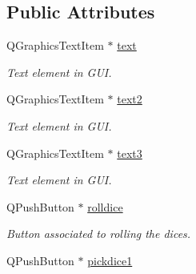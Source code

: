 \subsection*{Public Attributes}
\begin{DoxyCompactItemize}
\item 
\hypertarget{classgameScene__1_ad5566342744b3278fa281479993b5a7b}{Q\-Graphics\-Text\-Item $\ast$ \hyperlink{classgameScene__1_ad5566342744b3278fa281479993b5a7b}{text}}\label{classgameScene__1_ad5566342744b3278fa281479993b5a7b}

\begin{DoxyCompactList}\small\item\em Text element in G\-U\-I. \end{DoxyCompactList}\item 
\hypertarget{classgameScene__1_af4a2b60c066b3e965a672dec9f4ff892}{Q\-Graphics\-Text\-Item $\ast$ \hyperlink{classgameScene__1_af4a2b60c066b3e965a672dec9f4ff892}{text2}}\label{classgameScene__1_af4a2b60c066b3e965a672dec9f4ff892}

\begin{DoxyCompactList}\small\item\em Text element in G\-U\-I. \end{DoxyCompactList}\item 
\hypertarget{classgameScene__1_ae17987bf12c7ae15fd5152f2d4bce67c}{Q\-Graphics\-Text\-Item $\ast$ \hyperlink{classgameScene__1_ae17987bf12c7ae15fd5152f2d4bce67c}{text3}}\label{classgameScene__1_ae17987bf12c7ae15fd5152f2d4bce67c}

\begin{DoxyCompactList}\small\item\em Text element in G\-U\-I. \end{DoxyCompactList}\item 
\hypertarget{classgameScene__1_ad00160f995743593406bb40bf2d58794}{Q\-Push\-Button $\ast$ \hyperlink{classgameScene__1_ad00160f995743593406bb40bf2d58794}{rolldice}}\label{classgameScene__1_ad00160f995743593406bb40bf2d58794}

\begin{DoxyCompactList}\small\item\em Button associated to rolling the dices. \end{DoxyCompactList}\item 
\hypertarget{classgameScene__1_a0829ec3dc03565eccb0acae631f9f143}{Q\-Push\-Button $\ast$ \hyperlink{classgameScene__1_a0829ec3dc03565eccb0acae631f9f143}{pickdice1}}\label{classgameScene__1_a0829ec3dc03565eccb0acae631f9f143}


\end{DoxyCompactItemize}
